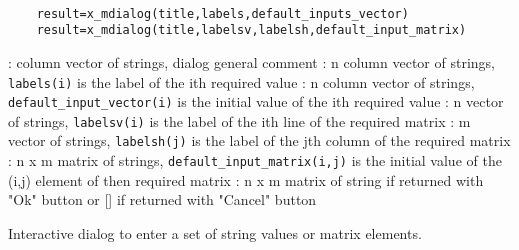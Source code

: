 
\begin{mandesc}
   \\ %
\end{mandesc}
\label{x-mdialog}
\begin{calling_sequence}
  \begin{verbatim}
    result=x_mdialog(title,labels,default_inputs_vector)   
    result=x_mdialog(title,labelsv,labelsh,default_input_matrix)   
  \end{verbatim}
\end{calling_sequence}

\begin{parameters}
  \begin{varlist}
    : column vector of strings, dialog general comment
    : n column vector of strings, \verb!labels(i)! is the label of  the ith required value
    : n  column vector of strings, \verb!default_input_vector(i)! is the initial 
    value of  the ith required value
    : n  vector of strings, \verb!labelsv(i)! is the label of  the ith line of the required matrix
    : m  vector of strings, \verb!labelsh(j)! is the label of  the jth column of the required matrix
    : n x m matrix of strings, \verb!default_input_matrix(i,j)! is the initial value of the (i,j) element of then required matrix
    : n x m matrix of string if returned with "Ok" button or [] if returned with "Cancel" button
  \end{varlist}
\end{parameters}
\begin{mandescription}
  Interactive dialog to enter a set of string values or matrix elements.
\end{mandescription}
\begin{examples}
  \begin{program}
  \end{program}
\end{examples}
\begin{manseealso}
\end{manseealso}

